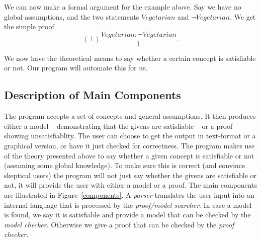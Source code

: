We can now make a formal argument for the example above. Say we have no global
assumptions, and the two statements $Vegetarian$ and
$\lnot Vegetarian$. We get the simple proof
\[
(\bot) \frac{Vegetarian; \lnot Vegetarian}{\bot}.
\]

We now have the theoretical means to say whether a certain concept is satisfiable
or not. Our program will automate this for us.

\subsection{Description of Main Components}

The program accepts a set of concepts and general assumptions. It then produces
either a model -- demonstrating that the givens are satisfiable -- or a proof
showing unsatisfiablity. The user can choose to get the output in text-format or
a graphical version, or have it just checked for correctness.
The program makes use of the theory presented above to say whether a given concept
is satisfiable or not (assuming some global knowledge). To make sure this is correct
(and convince skeptical users) the program will not just say whether the givens
are satisfiable or not, it will provide the user with either a model or a proof.
The main components are illustrated in Figure~\ref{components}. A \emph{parser} translates
the user input into an internal language that is processed by the
\emph{proof/model searcher}.
In case a model is found, we say it is satisfiable and provide a model that can be
checked by the \emph{model checker}. Otherwise we give a proof that can be checked
by the \emph{proof checker}.

